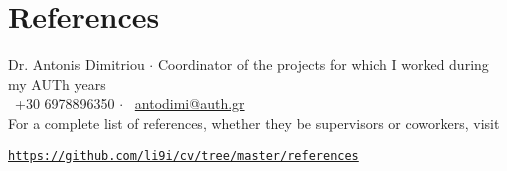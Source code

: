 \documentclass[a4paper,10pt,twoside]{article}
\begin{document}

\section{References}
\noindent Dr. Antonis Dimitriou $\cdot$ Coordinator of the projects for which I worked during my AUTh years \\
\faPhone \ +30 6978896350 $\cdot$ \faEnvelopeO \ \href{mailto:antodimi@auth.gr}{antodimi@auth.gr} \\

\noindent For a complete list of references, whether they be supervisors or coworkers, visit
\begin{center}\noindent
\href{https://github.com/li9i/cv/tree/master/references}{\texttt{https://github.com/li9i/cv/tree/master/references}}
\end{center}

\vspace*{\fill}
\end{document}
